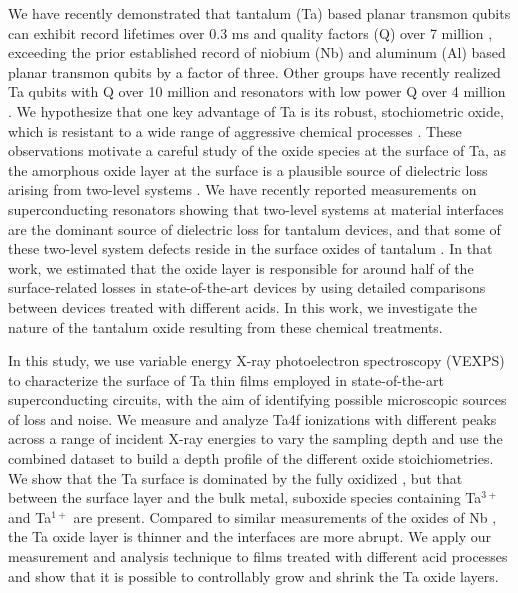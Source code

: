 \documentclass{WileyMSP-template}
\begin{document}
We have recently demonstrated that tantalum (Ta) based planar transmon qubits can exhibit record lifetimes over 0.3 ms and quality factors (Q) over 7 million \cite{place_new_2021}, exceeding the prior established record of niobium (Nb) and aluminum (Al) based planar transmon qubits by a factor of three. Other groups have recently realized Ta qubits with Q over 10 million and resonators with low power Q over 4 million \cite{wang_towards_2022, lozano_manufacturing_2022}. We hypothesize that one key advantage of Ta is its robust, stochiometric oxide, which is resistant to a wide range of aggressive chemical processes \cite{face_high_1986, face_nucleation_1987}. These observations motivate a careful study of the oxide species at the surface of Ta, as the amorphous oxide layer at the surface is a plausible source of dielectric loss arising from two-level systems \cite{muller_towards_2019, de_leon_materials_2021}. We have recently reported measurements on superconducting resonators showing that two-level systems at material interfaces are the dominant source of dielectric loss for tantalum devices, and that some of these two-level system defects reside in the surface oxides of tantalum \cite{kevin_resonator}. In that work, we estimated that the oxide layer is responsible for around half of the surface-related losses in state-of-the-art devices by using detailed comparisons between devices treated with different acids. In this work, we investigate the nature of the tantalum oxide resulting from these chemical treatments.

In this study, we use variable energy X-ray photoelectron spectroscopy (VEXPS) to characterize the surface of Ta thin films employed in state-of-the-art superconducting circuits, with the aim of identifying possible microscopic sources of loss and noise. We measure and analyze Ta4f ionizations with different peaks across a range of incident X-ray energies to vary the sampling depth and use the combined dataset to build a depth profile of the different oxide stoichiometries. We show that the Ta surface is dominated by the fully oxidized , but that between the  surface layer and the bulk metal, suboxide species containing Ta$^{3+}$ and Ta$^{1+}$ are present. Compared to similar measurements of the oxides of Nb \cite{Anjali_Nb:2021}, the Ta oxide layer is thinner and the interfaces are more abrupt. We apply our measurement and analysis technique to films treated with different acid processes and show that it is possible to controllably grow and shrink the Ta oxide layers.
\end{document}
